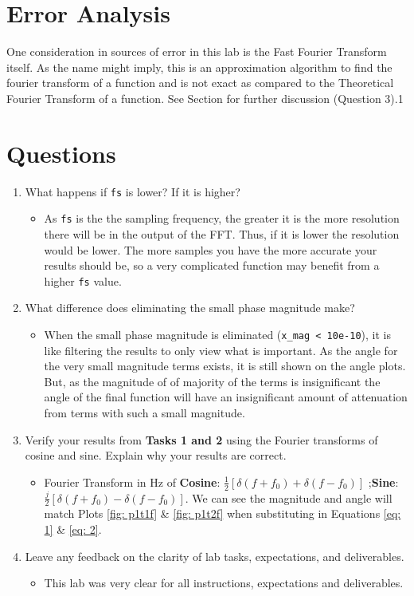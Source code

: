 \documentclass[12pt]{report}
\begin{document}
\section{Error Analysis}\label{section: ErAn}
One consideration in sources of error in this lab is the Fast Fourier Transform itself. As the name might imply, this is an approximation algorithm to find the fourier transform
of a function and is not exact as compared to the Theoretical Fourier Transform of a function. See  Section for further discussion (Question 3).1
\section{Questions}\label{section: Questions}
\begin{enumerate}
  \item What happens if \texttt{fs} is lower? If it is higher?
  \begin{itemize}
    \item As \texttt{fs} is the the sampling frequency, the greater it is the more resolution there will be in the output of the FFT. Thus, if it is lower the resolution
    would be lower. The more samples you have the more accurate your results should be, so a very complicated function may benefit from a higher \texttt{fs} value.
  \end{itemize}
  \item What difference does eliminating the small phase magnitude make?
  \begin{itemize}
    \item When the small phase magnitude is eliminated (\texttt{x\_mag < 10e-10}), it is like filtering the results to only view what is important. As the angle for the
    very small magnitude terms exists, it is still shown on the angle plots. But, as the magnitude of of majority of the terms is insignificant the angle of the final 
    function will have an insignificant amount of attenuation from terms with such a small magnitude.
  \end{itemize}
  \item Verify your results from \textbf{Tasks 1 and 2} using the Fourier transforms of cosine and sine. Explain why your results are correct.
  \begin{itemize}
    \item Fourier Transform in Hz of \textbf{Cosine}: $\frac{1}{2}[\delta(f+f_0) + \delta(f-f_0)]$ ;\textbf{Sine}: $\frac{j}{2}[\delta(f+f_0) - \delta(f-f_0)]$. We can see the magnitude and angle will match Plots \ref{fig: p1t1f} \& \ref{fig: p1t2f}
    when substituting in Equations \eqref{eq: 1} \& \eqref{eq: 2}.
  \end{itemize}
  \item Leave any feedback on the clarity of lab tasks, expectations, and deliverables.
  \begin{itemize}
    \item This lab was very clear for all instructions, expectations and deliverables.
  \end{itemize}
\end{enumerate}
\end{document}
